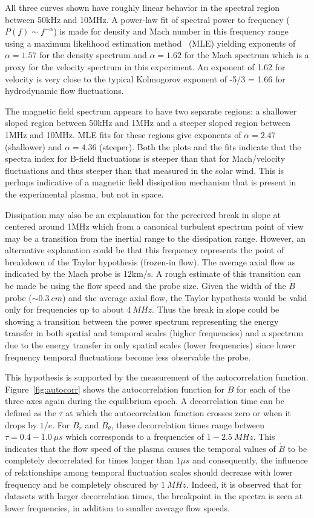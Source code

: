 \documentclass[12pt]{iopart}
\begin{document}
All three curves shown have roughly linear behavior in the spectral region between 50kHz and 10MHz. A power-law fit of spectral power to frequency ($P(f) \sim f^{-\alpha}$) is made for density and Mach number in this frequency range using a maximum likelihood estimation method~\cite{clauset09} (MLE) yielding exponents of $\alpha = 1.57$ for the density spectrum and $\alpha = 1.62$ for the Mach spectrum which is a proxy for the velocity spectrum in this experiment. An exponent of 1.62 for velocity is very close to the typical Kolmogorov exponent of -5/3 = 1.66 for hydrodynamic flow fluctuations.

The magnetic field spectrum appears to have two separate regions: a shallower sloped region between 50kHz and 1MHz and a steeper sloped region between 1MHz and 10MHz. MLE fits for these regions give exponents of $\alpha = 2.47$ (shallower) and $\alpha = 4.36$ (steeper). Both the plots and the fits indicate that the spectra index for B-field fluctuations is steeper than that for Mach/velocity fluctuations and thus steeper than that measured in the solar wind. This is perhaps indicative of a magnetic field dissipation mechanism that is present in the experimental plasma, but not in space.

Dissipation may also be an explanation for the perceived break in slope at centered around 1MHz which from a canonical turbulent spectrum point of view may be a transition from the inertial range to the dissipation range. However, an alternative explanation could be that this frequency represents the point of breakdown of the Taylor hypothesis (frozen-in flow). The average axial flow as indicated by the Mach probe is 12km/s. A rough estimate of this transition can be made be using the flow speed and the probe size. Given the width of the $\dot{B}$ probe ($\sim 0.3~cm$) and the average axial flow, the Taylor hypothesis would be valid only for frequencies up to about $4~MHz$. Thus the break in slope could be showing a transition between the power spectrum representing the energy transfer in both spatial and temporal scales (higher frequencies) and a spectrum due to the energy transfer in only spatial scales (lower frequencies) since lower frequency temporal fluctuations become less observable the probe. 

This hypothesis is supported by the measurement of the autocorrelation function. Figure~\ref{fig:autocorr} shows the autocorrelation function for $\dot{B}$ for each of the three axes again during the equilibrium epoch. A decorrelation time can be defined as the $\tau$ at which the autocorrelation function crosses zero or when it drops by $1/e$. For $\dot{B}_{r}$ and $\dot{B}_{\theta}$, these decorrelation times range between $\tau = 0.4-1.0~\mu s$ which corresponds to a frequencies of $1-2.5~MHz$. This indicates that the flow speed of the plasma causes the temporal values of $\dot{B}$ to be completely decorrelated for times longer than $1 \mu s$ and consequently, the influence of relationships among temporal fluctuation scales should decrease with lower frequency and be completely obscured by $1~MHz$. Indeed, it is observed that for datasets with larger decorrelation times, the breakpoint in the spectra is seen at lower frequencies, in addition to smaller average flow speeds.
\end{document}

